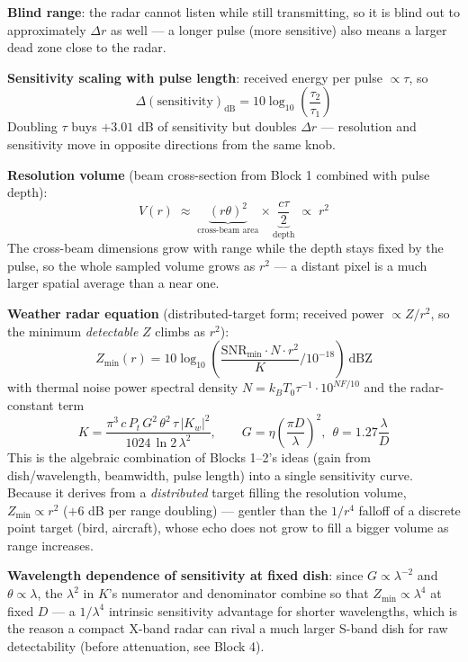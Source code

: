 \documentclass[11pt]{article}
\begin{document}
\textbf{Blind range}: the radar cannot listen while still transmitting, so it is blind out to approximately $\Delta r$ as well --- a longer pulse (more sensitive) also means a larger dead zone close to the radar.

\textbf{Sensitivity scaling with pulse length}: received energy per pulse $\propto \tau$, so
\begin{equation}
\Delta(\mathrm{sensitivity})_{\mathrm{dB}} = 10\log_{10}\!\left(\frac{\tau_2}{\tau_1}\right)
\end{equation}
Doubling $\tau$ buys $+3.01$ dB of sensitivity but doubles $\Delta r$ --- resolution and sensitivity move in opposite directions from the same knob.

\textbf{Resolution volume} (beam cross-section from Block 1 combined with pulse depth):
\begin{equation}
V(r) \;\approx\; \underbrace{(r\theta)^2}_{\text{cross-beam area}} \times \underbrace{\frac{c\tau}{2}}_{\text{depth}} \;\propto\; r^2
\end{equation}
The cross-beam dimensions grow with range while the depth stays fixed by the pulse, so the whole sampled volume grows as $r^2$ --- a distant pixel is a much larger spatial average than a near one.

\textbf{Weather radar equation} (distributed-target form; received power $\propto Z/r^2$, so the minimum \emph{detectable} $Z$ climbs as $r^2$):
\begin{equation}
Z_{\min}(r) = 10\log_{10}\!\left(\frac{\mathrm{SNR}_{\min}\cdot N\cdot r^2}{K}\Big/10^{-18}\right)\ \text{dBZ}
\end{equation}
with thermal noise power spectral density $N = k_BT_0\tau^{-1}\cdot10^{NF/10}$ and the radar-constant term
\begin{equation}
K = \frac{\pi^3\, c\, P_t\, G^2\,\theta^2\,\tau\, |K_w|^2}{1024\,\ln 2\,\lambda^2}, \qquad G = \eta\left(\frac{\pi D}{\lambda}\right)^2,\ \ \theta = 1.27\frac{\lambda}{D}
\end{equation}
This is the algebraic combination of Blocks 1--2's ideas (gain from dish/wavelength, beamwidth, pulse length) into a single sensitivity curve. Because it derives from a \emph{distributed} target filling the resolution volume, $Z_{\min}\propto r^2$ ($+6$ dB per range doubling) --- gentler than the $1/r^4$ falloff of a discrete point target (bird, aircraft), whose echo does not grow to fill a bigger volume as range increases.

\textbf{Wavelength dependence of sensitivity at fixed dish}: since $G\propto\lambda^{-2}$ and $\theta\propto\lambda$, the $\lambda^2$ in $K$'s numerator and denominator combine so that $Z_{\min}\propto \lambda^{4}$ at fixed $D$ --- a $1/\lambda^4$ intrinsic sensitivity advantage for shorter wavelengths, which is the reason a compact X-band radar can rival a much larger S-band dish for raw detectability (before attenuation, see Block 4).
\end{document}
